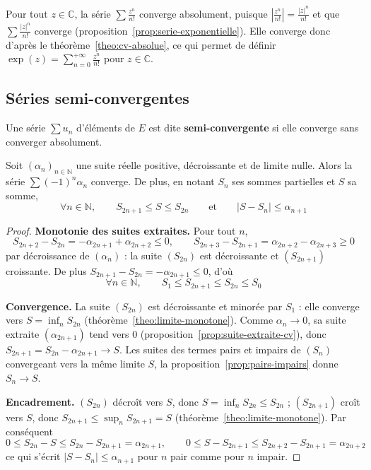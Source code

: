 \begin{exemple}
Pour tout $z\in\mathbb{C}$, la série $\sum\frac{z^n}{n!}$ converge absolument, puisque $\left|\frac{z^n}{n!}\right|=\frac{|z|^n}{n!}$ et que $\sum\frac{|z|^n}{n!}$ converge (proposition~\ref{prop:serie-exponentielle}). Elle converge donc d'après le théorème~\ref{theo:cv-absolue}, ce qui permet de définir $\exp(z)=\sum_{n=0}^{+\infty}\frac{z^n}{n!}$ pour $z\in\mathbb{C}$.
\end{exemple}

\subsection{Séries semi-convergentes}

\begin{defi}
\label{defi:semi-convergente}
Une série $\sum u_n$ d'éléments de $E$ est dite \textbf{semi-convergente} si elle converge sans converger absolument.
\end{defi}

\begin{theo}
\label{theo:cssa}
Soit $(\alpha_n)_{n\in\mathbb{N}}$ une suite réelle positive, décroissante et de limite nulle. Alors la série $\sum(-1)^n\alpha_n$ converge. De plus, en notant $S_n$ ses sommes partielles et $S$ sa somme,
\[\forall n\in\mathbb{N},\qquad S_{2n+1}\leq S\leq S_{2n}\qquad\text{et}\qquad|S-S_n|\leq\alpha_{n+1}\]
\end{theo}

\begin{proof}
\textbf{Monotonie des suites extraites.} Pour tout $n$,
\[S_{2n+2}-S_{2n}=-\alpha_{2n+1}+\alpha_{2n+2}\leq 0,\qquad S_{2n+3}-S_{2n+1}=\alpha_{2n+2}-\alpha_{2n+3}\geq 0\]
par décroissance de $(\alpha_n)$ : la suite $(S_{2n})$ est décroissante et $(S_{2n+1})$ croissante. De plus $S_{2n+1}-S_{2n}=-\alpha_{2n+1}\leq 0$, d'où
\[\forall n\in\mathbb{N},\qquad S_1\leq S_{2n+1}\leq S_{2n}\leq S_0\]

\textbf{Convergence.} La suite $(S_{2n})$ est décroissante et minorée par $S_1$ : elle converge vers $S=\inf_nS_{2n}$ (théorème~\ref{theo:limite-monotone}). Comme $\alpha_n\to 0$, sa suite extraite $(\alpha_{2n+1})$ tend vers $0$ (proposition~\ref{prop:suite-extraite-cv}), donc $S_{2n+1}=S_{2n}-\alpha_{2n+1}\to S$. Les suites des termes pairs et impairs de $(S_n)$ convergeant vers la même limite $S$, la proposition~\ref{prop:pairs-impairs} donne $S_n\to S$.

\textbf{Encadrement.} $(S_{2n})$ décroît vers $S$, donc $S=\inf_nS_{2n}\leq S_{2n}$ ; $(S_{2n+1})$ croît vers $S$, donc $S_{2n+1}\leq\sup_nS_{2n+1}=S$ (théorème~\ref{theo:limite-monotone}). Par conséquent
\[0\leq S_{2n}-S\leq S_{2n}-S_{2n+1}=\alpha_{2n+1},\qquad 0\leq S-S_{2n+1}\leq S_{2n+2}-S_{2n+1}=\alpha_{2n+2}\]
ce qui s'écrit $|S-S_n|\leq\alpha_{n+1}$ pour $n$ pair comme pour $n$ impair.
\end{proof}

